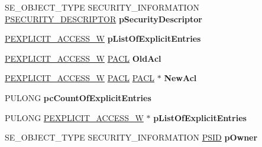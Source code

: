 \begin{DoxyCompactItemize}
\item 
\mbox{\label{struct___n_t_m_a_r_t_a_ab28a4d641f5458f788b7d37554a21353}} 
S\+E\+\_\+\+O\+B\+J\+E\+C\+T\+\_\+\+T\+Y\+PE S\+E\+C\+U\+R\+I\+T\+Y\+\_\+\+I\+N\+F\+O\+R\+M\+A\+T\+I\+ON \hyperlink{struct___s_e_c_u_r_i_t_y___d_e_s_c_r_i_p_t_o_r}{P\+S\+E\+C\+U\+R\+I\+T\+Y\+\_\+\+D\+E\+S\+C\+R\+I\+P\+T\+OR} {\bfseries p\+Security\+Descriptor}
\item 
\mbox{\label{struct___n_t_m_a_r_t_a_a899471dbc3b4fed628b914df481ee11d}} 
\hyperlink{struct___e_x_p_l_i_c_i_t___a_c_c_e_s_s___w}{P\+E\+X\+P\+L\+I\+C\+I\+T\+\_\+\+A\+C\+C\+E\+S\+S\+\_\+W} {\bfseries p\+List\+Of\+Explicit\+Entries}
\item 
\mbox{\label{struct___n_t_m_a_r_t_a_a264c5439d8f75b2210a5876e5733a45c}} 
\hyperlink{struct___e_x_p_l_i_c_i_t___a_c_c_e_s_s___w}{P\+E\+X\+P\+L\+I\+C\+I\+T\+\_\+\+A\+C\+C\+E\+S\+S\+\_\+W} \hyperlink{struct___a_c_l}{P\+A\+CL} {\bfseries Old\+Acl}
\item 
\mbox{\label{struct___n_t_m_a_r_t_a_a93ff5d64d4c7f8671753b1c86ada7b8d}} 
\hyperlink{struct___e_x_p_l_i_c_i_t___a_c_c_e_s_s___w}{P\+E\+X\+P\+L\+I\+C\+I\+T\+\_\+\+A\+C\+C\+E\+S\+S\+\_\+W} \hyperlink{struct___a_c_l}{P\+A\+CL} \hyperlink{struct___a_c_l}{P\+A\+CL} $\ast$ {\bfseries New\+Acl}
\item 
\mbox{\label{struct___n_t_m_a_r_t_a_a11625304452990ad92a91078b0028195}} 
P\+U\+L\+O\+NG {\bfseries pc\+Count\+Of\+Explicit\+Entries}
\item 
\mbox{\label{struct___n_t_m_a_r_t_a_ad3207fdd74e058e8454ec342f9ed574d}} 
P\+U\+L\+O\+NG \hyperlink{struct___e_x_p_l_i_c_i_t___a_c_c_e_s_s___w}{P\+E\+X\+P\+L\+I\+C\+I\+T\+\_\+\+A\+C\+C\+E\+S\+S\+\_\+W} $\ast$ {\bfseries p\+List\+Of\+Explicit\+Entries}
\item 
\mbox{\label{struct___n_t_m_a_r_t_a_afa178a6966055b196f54a0631fb1ceee}} 
S\+E\+\_\+\+O\+B\+J\+E\+C\+T\+\_\+\+T\+Y\+PE S\+E\+C\+U\+R\+I\+T\+Y\+\_\+\+I\+N\+F\+O\+R\+M\+A\+T\+I\+ON \hyperlink{struct___s_i_d}{P\+S\+ID} {\bfseries p\+Owner}
\item 
\mbox{\label{struct___n_t_m_a_r_t_a_ac60ed257d782533310e41f43b7ef99ea}} 

\end{DoxyCompactItemize}
